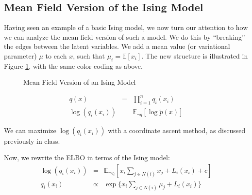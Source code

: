 \documentclass[twoside]{article}
\begin{document}
\subsection{Mean Field Version of the Ising Model}

Having seen an example of a basic Ising model, we now turn our attention to how we can analyze the mean field version of such a model. We do this by ``breaking'' the edges between the latent variables. We add a mean value (or variational parameter) $\mu$ to each $x$, such that $\mu_i=\mathbb{E}[x_i]$. The new structure is illustrated in Figure \ref{meanfield}, with the same color coding as above. 

\begin{figure}[H]
\begin{center}
\end{center}
\caption{Mean Field Version of an Ising Model}
\label{meanfield}
\end{figure}


\begin{eqnarray*}
q(x) &=& \prod_{i=1}^n q_i (x_i) \\
\log ( q_i (x_i)) &=& \mathbb{E}_{\neg q} [ \log \tilde{p}(x) ]
\end{eqnarray*}

We can maximize $\log ( q_i (x_i))$ with a coordinate ascent method, as discussed previously in class.

Now, we rewrite the ELBO in terms of the Ising model:
\begin{eqnarray*}
\log (q_i (x_i)) &=& \mathbb{E}_{\neg q_i} [ x_i \sum_{j \in N(i)} x_j + L_i(x_i) +c ] \\
q_i (x_i) &\propto& \exp \{ x_i \sum_{j \in N(i)} \mu_j + L_i(x_i) \}
\end{eqnarray*}
\end{document}
